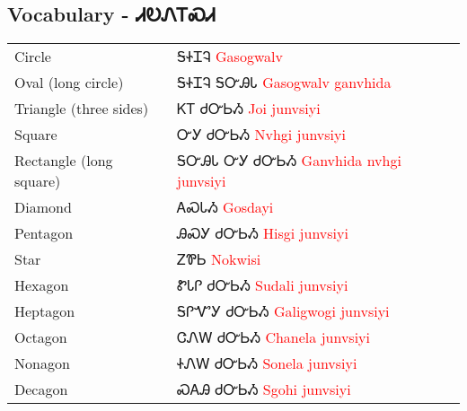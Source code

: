 \subsection{Vocabulary - ᏗᎧᏁᎢᏍᏗ 
}
\begin{minipage}{\linewidth}
\begin{tabular}{p{5cm} p{9cm}}
Circle & ᎦᏐᏆᎸ 
 \newline \textcolor{red}{Gasogwalv}\\
Oval (long circle) & ᎦᏐᏆᎸ ᎦᏅᎯᏓ 
 \newline \textcolor{red}{Gasogwalv ganvhida}\\
Triangle (three sides) & ᏦᎢ ᏧᏅᏏᏱ 
 \newline \textcolor{red}{Joi junvsiyi}\\
Square & ᏅᎩ ᏧᏅᏏᏱ 
 \newline \textcolor{red}{Nvhgi junvsiyi}\\
Rectangle (long square) & ᎦᏅᎯᏓ ᏅᎩ ᏧᏅᏏᏱ 
 \newline \textcolor{red}{Ganvhida nvhgi junvsiyi}\\
Diamond & ᎪᏍᏓᏱ 
 \newline \textcolor{red}{Gosdayi}\\
Pentagon & ᎯᏍᎩ ᏧᏅᏏᏱ 
 \newline \textcolor{red}{Hisgi junvsiyi}\\
Star & ᏃᏈᏏ 
 \newline \textcolor{red}{Nokwisi}\\
Hexagon & ᏑᏓᎵ ᏧᏅᏏᏱ 
 \newline \textcolor{red}{Sudali junvsiyi}\\
Heptagon & ᎦᎵᏉᎩ ᏧᏅᏏᏱ 
 \newline \textcolor{red}{Galigwogi junvsiyi}\\
Octagon & ᏣᏁᎳ ᏧᏅᏏᏱ 
 \newline \textcolor{red}{Chanela junvsiyi}\\
Nonagon & ᏐᏁᎳ ᏧᏅᏏᏱ 
 \newline \textcolor{red}{Sonela junvsiyi}\\
Decagon & ᏍᎪᎯ ᏧᏅᏏᏱ 
 \newline \textcolor{red}{Sgohi junvsiyi}\\
\end{tabular}
\end{minipage}

